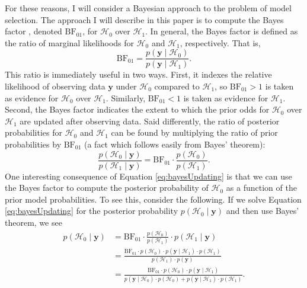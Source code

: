 \documentclass[12pt,twoside,a4paper]{article}
\begin{document}
For these reasons, I will consider a Bayesian approach to the problem of model selection. The approach I will describe in this paper is to compute the Bayes factor \citep{kassRaftery1995}, denoted $\text{BF}_{01}$, for $\mathcal{H}_0$ over $\mathcal{H}_1$. In general, the Bayes factor is defined as the ratio of marginal likelihoods for $\mathcal{H}_0$ and $\mathcal{H}_1$, respectively. That is,%
\begin{equation}\label{eq:marginal}
 \text{BF}_{01} = \frac{p(\bm{y}\mid \mathcal{H}_0)}{p(\bm{y}\mid \mathcal{H}_1)}.
\end{equation}%
This ratio is immediately useful in two ways. First, it indexes the relative likelihood of observing data $\bm{y}$ under $\mathcal{H}_0$ compared to $\mathcal{H}_1$, so $\text{BF}_{01}>1$ is taken as evidence for $\mathcal{H}_0$ over $\mathcal{H}_1$. Similarly, $\text{BF}_{01}<1$ is taken as evidence for $\mathcal{H}_1$. Second, the Bayes factor indicates the extent to which the prior odds for $\mathcal{H}_0$ over $\mathcal{H}_1$ are updated after observing data. Said differently, the ratio of posterior probabilities for $\mathcal{H}_0$ and $\mathcal{H}_1$ can be found by multiplying the ratio of prior probabilities by $\text{BF}_{01}$ (a fact which follows easily from Bayes' theorem):%
\begin{equation}\label{eq:bayesUpdating}
  \frac{p(\mathcal{H}_0\mid \bm{y})}{p(\mathcal{H}_1\mid \bm{y})} =  \text{BF}_{01}\cdot \frac{p(\mathcal{H}_0)}{p(\mathcal{H}_1)}.
\end{equation}%
One interesting consequence of Equation \ref{eq:bayesUpdating} is that we can use the Bayes factor to compute the posterior probability of $\mathcal{H}_0$ as a function of the prior model probabilities. To see this, consider the following. If we solve Equation \ref{eq:bayesUpdating} for the posterior probability $p(\mathcal{H}_0\mid \bm{y})$ and then use Bayes' theorem, we see%
\begin{align*}
  p(\mathcal{H}_0\mid \bm{y}) &= \text{BF}_{01} \cdot \frac{p(\mathcal{H}_0)}{p(\mathcal{H}_1)} \cdot p(\mathcal{H}_1\mid \bm{y})\\
                              &= \frac{\text{BF}_{01} \cdot p(\mathcal{H}_0) \cdot p(\bm{y}\mid \mathcal{H}_1)\cdot p(\mathcal{H}_1)}{p(\mathcal{H}_1)\cdot p(\bm{y})}\\
  &= \frac{\text{BF}_{01}\cdot p(\mathcal{H}_0)\cdot p(\bm{y}\mid \mathcal{H}_1)}{p(\bm{y}\mid \mathcal{H}_0)\cdot p(\mathcal{H}_0) + p(\bm{y}\mid \mathcal{H}_1)\cdot p(\mathcal{H}_1)}.
\end{align*}%
\end{document}
